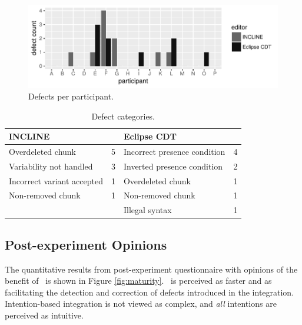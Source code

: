 \begin{figure}[ht]
    \centering
    \includegraphics{figure/incl-par-errors.pdf}
    \caption{Defects per participant.}
    \label{fig:paricipant-errors}
\end{figure}

\begin{table}[ht]
    \centering
    \begin{tabular}{l l|l l}
    \hline
    \hline
        \textbf{INCLINE} & & \textbf{Eclipse CDT} & \\\hline
        Overdeleted chunk          & 5 & Incorrect presence condition & 4\\
        Variability not handled    & 3 & Inverted presence condition & 2\\
        Incorrect variant accepted & 1 & Overdeleted chunk & 1\\
        Non-removed chunk          & 1 & Non-removed chunk & 1\\
                                   &   & Illegal syntax & 1\\\hline\hline
    \end{tabular}
    \caption{Defect categories.}
    \label{tab:defcat}
\end{table}

\subsection{Post-experiment Opinions}
The quantitative results from post-experiment questionnaire with opinions of the benefit of \tooln~is shown in Figure \ref{fig:maturity}. \tooln~is perceived as faster and as facilitating the detection and correction of defects introduced in the integration. Intention-based integration is not viewed as complex, and \textit{all} intentions are perceived as intuitive.

